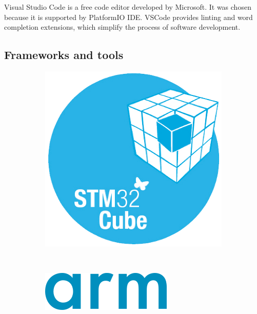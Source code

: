 \documentclass[a4paper,twoside,12pt]{book}
\begin{document}
Visual Studio Code is a free code editor developed by Microsoft.
It was chosen because it is supported by PlatformIO IDE.
VSCode provides linting and word completion extensions,
which simplify the process of software development.

\subsection{Frameworks and tools}

\begin{figure}[H]
    \centering
    \begin{subfigure}[h]{0.23\textwidth}
        \includegraphics[width=\textwidth]{images/cube_logo}
        \label{fig:cube}
    \end{subfigure}
    ~
    \begin{subfigure}[h]{0.23\textwidth}
        \includegraphics[width=\textwidth]{images/arm_logo}
        \label{fig:arm}

\end{subfigure}
\end{figure}
\end{document}
